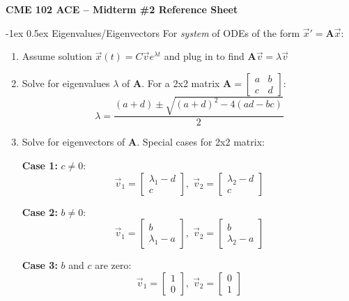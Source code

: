 \documentclass[10pt,landscape]{article}
\makeatletter
\renewcommand{\section}{\@startsection{section}{1}{0mm}%
                                {-1ex}%
                                {0.5ex}%
                                {\normalfont\large\bfseries}}
\makeatother
\begin{document}
\raggedright
\footnotesize

\begin{center}
     \Large{\textbf{CME 102 ACE -- Midterm \#2 Reference Sheet}} \\
\end{center}
\begin{multicols}{3}
\setlength{\premulticols}{1pt}
\setlength{\postmulticols}{1pt}
\setlength{\multicolsep}{1pt}
\setlength{\columnsep}{2pt}

\section{Eigenvalues/Eigenvectors}
For \textit{system} of ODEs of the form $\vec{x}' = \mathbf{A}\vec{x}$:
\begin{enumerate}
\item Assume solution $\vec{x}(t) = C\vec{v} e^{\lambda t}$ and plug in to find $\mathbf{A}\vec{v} = \lambda \vec{v}$

\item Solve for eigenvalues $\lambda$ of $\mathbf{A}$. For a 2x2 matrix $\mathbf{A} = \begin{bmatrix} a & b \\ c & d \end{bmatrix}$:
\[ \lambda = \frac{(a+d) \pm \sqrt{(a+d)^2 - 4(ad-bc)} }{2} \]

\item Solve for eigenvectors of $\mathbf{A}$. Special cases for 2x2 matrix:
\par \textbf{Case 1:} $c \neq 0$:
\[ \vec{v}_1 = \begin{bmatrix} \lambda_1 - d \\ c \end{bmatrix}, \; \vec{v}_2 = \begin{bmatrix} \lambda_2 -d \\ c \end{bmatrix} \]
\par \textbf{Case 2:} $b \neq 0$:
\[ \vec{v}_1 = \begin{bmatrix} b \\  \lambda_1 - a \end{bmatrix}, \; \vec{v}_2 = \begin{bmatrix} b \\ \lambda_2 - a \end{bmatrix} \]
\par \textbf{Case 3:} $b$ and $c$ are zero:
\[ \vec{v}_1 = \begin{bmatrix} 1 \\ 0 \end{bmatrix}, \; \vec{v}_2 = \begin{bmatrix} 0 \\ 1 \end{bmatrix} \]


\end{enumerate}
\end{multicols}
\end{document}
